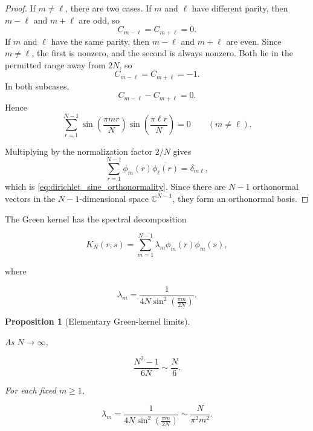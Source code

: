 \documentclass[11pt]{amsart}
\numberwithin{equation}{section}
\theoremstyle{plain}
\newtheorem{proposition}[theorem]{Proposition}
\theoremstyle{definition}
\theoremstyle{remark}
\begin{document}
\begin{proof}
If \(m\ne\ell\), there are two cases. If \(m\) and \(\ell\) have different parity, then \(m-\ell\) and \(m+\ell\) are odd, so
\[
C_{m-\ell}=C_{m+\ell}=0.
\]
If \(m\) and \(\ell\) have the same parity, then \(m-\ell\) and \(m+\ell\) are even. Since \(m\ne\ell\), the first is nonzero, and the second is always nonzero. Both lie in the permitted range away from \(2N\), so
\[
C_{m-\ell}=C_{m+\ell}=-1.
\]
In both subcases,
\[
C_{m-\ell}-C_{m+\ell}=0.
\]
Hence
\[
\sum_{r=1}^{N-1}
\sin\left(\frac{\pi m r}{N}\right)
\sin\left(\frac{\pi \ell r}{N}\right)
=
0
\qquad(m\ne\ell).
\]

Multiplying by the normalization factor \(2/N\) gives
\[
\sum_{r=1}^{N-1}
\phi_m(r)\overline{\phi_\ell(r)}
=
\delta_{m\ell},
\]
which is \eqref{eq:dirichlet_sine_orthonormality}. Since there are \(N-1\) orthonormal vectors in the \(N-1\)-dimensional space
\(\mathbb C^{N-1}\), they form an orthonormal basis.

\end{proof}


The Green kernel has the spectral decomposition

\begin{equation}
K_N(r,s)
=
\sum_{m=1}^{N-1}
\lambda_m\phi_m(r)\phi_m(s),
\label{eq:KN_spectral_decomposition}
\end{equation}

where

\begin{equation}
\lambda_m
=
\frac{1}
{4N\sin^2\left(\frac{\pi m}{2N}\right)}.
\label{eq:KN_spectral_eigenvalues}
\end{equation}

\begin{proposition}[Elementary Green-kernel limits]
\label{prop:elementary_green_kernel_limits}

As \(N\to\infty\),

\begin{equation}
\frac{N^2-1}{6N}
\sim
\frac{N}{6}.
\label{eq:WN_trace_asymptotic}
\end{equation}

For each fixed \(m\ge1\),

\begin{equation}
\lambda_m
=
\frac{1}
{4N\sin^2\left(\frac{\pi m}{2N}\right)}
\sim
\frac{N}{\pi^2m^2}.
\label{eq:green_eigenvalue_fixed_m_asymptotic}
\end{equation}

\end{proposition}
\end{document}
